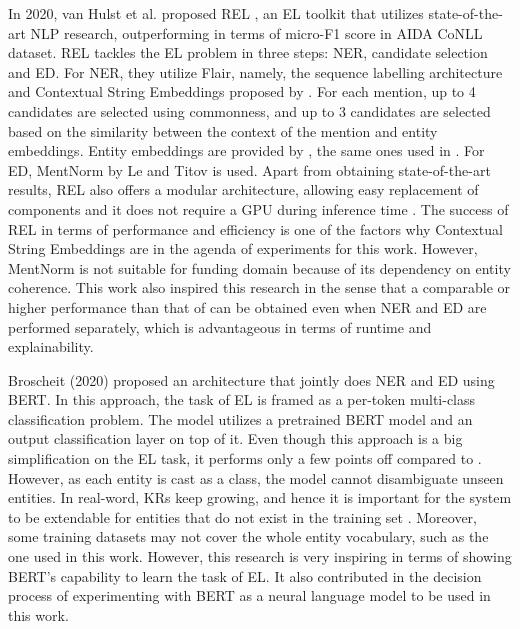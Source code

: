 \documentclass{report}
\theoremstyle{definition}
\theoremstyle{remark}
\begin{document}
In 2020, van Hulst et al. proposed REL \cite{REL}, an EL toolkit that utilizes state-of-the-art NLP research, outperforming \cite{kolitsas} in terms of micro-F1 score in AIDA CoNLL dataset. REL tackles the EL problem in three steps: NER, candidate selection and ED. For NER, they utilize Flair, namely, the sequence labelling architecture and Contextual String Embeddings proposed by \cite{flairpaper}. For each mention, up to 4 candidates are selected using commonness, and up to 3 candidates are selected based on the similarity between the context of the mention and entity embeddings. Entity embeddings are provided by \cite{kolitsasEmbed}, the same ones used in \cite{kolitsas}. For ED, MentNorm by Le and Titov \cite{mentnorm} is used. Apart from obtaining state-of-the-art results, REL also offers a modular architecture, allowing easy replacement of components and it does not require a GPU during inference time \cite{REL}. The success of REL in terms of performance and efficiency is one of the factors why Contextual String Embeddings are in the agenda of experiments for this work. However, MentNorm is not suitable for funding domain because of its dependency on entity coherence. This work also inspired this research in the sense that a comparable or higher performance than that of \cite{kolitsas} can be obtained even when NER and ED are performed separately, which is advantageous in terms of runtime and explainability.

Broscheit (2020) \cite{bertEL} proposed an architecture that jointly does NER and ED using BERT. In this approach, the task of EL is framed as a per-token multi-class classification problem. The model utilizes a pretrained BERT model and an output classification layer on top of it. Even though this approach is a big simplification on the EL task, it performs only a few points off compared to \cite{kolitsas}.  However, as each entity is cast as a class, the model cannot disambiguate unseen entities. In real-word, KRs keep growing, and hence it is important for the system to be extendable for entities that do not exist in the training set \cite{gupta}. Moreover, some training datasets may not cover the whole entity vocabulary, such as the one used in this work. However, this research is very inspiring in terms of showing BERT's capability to learn the task of EL. It also contributed in the decision process of experimenting with BERT as a neural language model to be used in this work.
\end{document}
